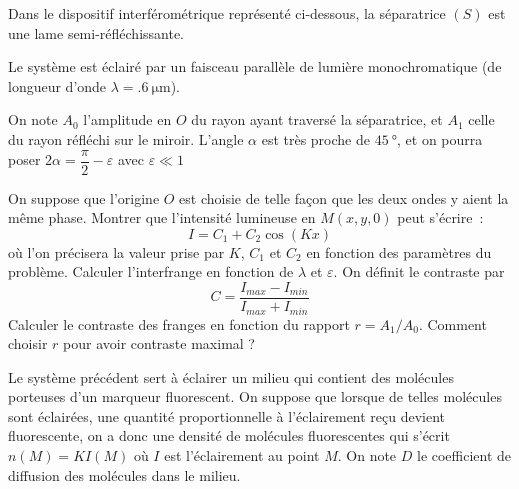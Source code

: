 \documentclass[a4paper,twoside,11pt]{article}
\begin{document}
Dans le dispositif interférométrique représenté ci-dessous, la séparatrice $(S)$ est une lame semi-réfléchissante. 
\begin{center}
\end{center}
Le système est éclairé par un faisceau parallèle de lumière	monochromatique (de longueur d'onde ${\lambda=\SI{.6}{\um}}$). 

On note $A_0$ l'amplitude en $O$ du rayon ayant traversé la séparatrice, et $A_1$ celle du rayon réfléchi sur le miroir.
L'angle $\alpha$ est très proche de $\SI{45}{\degree}$, et on pourra poser $2\alpha=\dfrac{\pi}{2}-\varepsilon$ avec $\varepsilon\ll1$

\qt On suppose que  l'origine $O$ est choisie de telle façon que les
deux ondes y aient la même phase. Montrer que l'intensité lumineuse en $M(x, y, 0)$ peut s'écrire~:
$$
I=C_1+C_2\cos(Kx)
$$
où l'on précisera la valeur prise par $K$, $C_1$ et $C_2$ en fonction des paramètres du problème.
\qt Calculer l'interfrange en fonction de $\lambda$ et $\varepsilon$.
On définit le contraste par 
$$C=\dfrac{I_{max}-I_{min}}{I_{max}+I_{min}}$$
\qt Calculer le contraste des franges en fonction du rapport $r = A_1/A_0$. Comment choisir $r$ pour avoir contraste maximal ?


Le système précédent sert à éclairer un milieu qui contient des molécules porteuses d'un marqueur fluorescent.  On suppose que lorsque de telles molécules sont éclairées, une quantité proportionnelle à l'éclairement reçu devient fluorescente, on a donc une densité de molécules fluorescentes qui s'écrit $n(M)=KI(M)$ où $I$ est l'éclairement au point $M$. On note $D$ le coefficient de diffusion des molécules dans le milieu.
\end{document}
